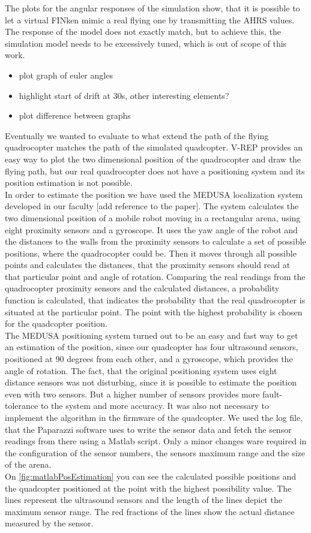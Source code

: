 The plots for the angular responses of the simulation show, that it is possible to let a virtual FINken mimic a real flying one by transmitting the \gls{AHRS} values. 
The response of the model does not exactly match, but to achieve this, the simulation model needs to be excessively tuned, which is out of scope of this work.
\begin{itemize}
\item{plot graph of euler angles}
\item{highlight start of drift at 30s, other interesting elements?}
\item{plot difference between graphs}
\end{itemize}


Eventually we wanted to evaluate to what extend the path of the flying quadrocopter matches the path of the simulated quadcopter. V-REP provides an easy way to plot the two dimensional position of the quadrocopter and draw the flying path, but our real quadrocopter does not have a positioning system and its position estimation is not possible.\\ In order to estimate the position we have used the MEDUSA localization system developed in our faculty [add reference to the paper]. The system calculates the two dimensional position of a mobile robot moving in a rectangular arena, using eight proximity sensors and a gyroscope. It uses the yaw angle of the robot and the distances to the walls from the proximity sensors to calculate a set of possible positions, where the quadrocopter could be. Then it moves through all possible points and calculates the distances, that the proximity sensors should read at that particular point and angle of rotation. Comparing the real readings from the quadrocopter proximity sensors and the calculated distances, a probability function is calculated, that indicates the probability that the real quadrocopter is situated at the particular point. The point with the highest probability is chosen for the quadcopter position.\\
The MEDUSA positioning system turned out to be an easy and fast way to get an estimation of the position, since our quadcopter has four ultrasound sensors, positioned at 90 degrees from each other, and a gyroscope, which provides the angle of rotation. The fact, that the original positioning system uses eight distance sensors was not disturbing, since it is possible to estimate the position even with two sensors. But a higher number of sensors provides more fault-tolerance to the system and more accuracy. It was also not necessary to implement the algorithm in the firmware of the quadcopter. We used the log file, that the Paparazzi software uses to write the sensor data and fetch the sensor readings from there using a Matlab script. Only a minor changes ware required in the configuration of the sensor numbers, the sensors maximum range and the size of the arena.\\
On \ref{fig:matlabPosEstimation} you can see the calculated possible positions and the quadcopter positioned at the point with the highest possibility value. The lines represent the ultrasound sensors and the length of the lines depict the maximum sensor range. The red fractions of the lines show the actual distance measured by the sensor. 

